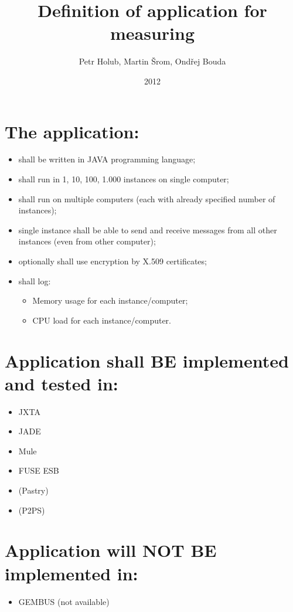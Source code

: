 \documentclass[a4paper]{article}
\title{Definition of application for measuring}
\author{Petr Holub, Martin Šrom, Ondřej Bouda}
\date{2012}
\begin{document}
\maketitle

\section{The application:}
\begin{itemize}
\item shall be written in \textsc{JAVA} programming language;
\item shall run in 1, 10, 100, 1.000 instances on single computer;
\item shall run on multiple computers (each with already specified number of instances);
\item single instance shall be able to send and receive messages from all other instances (even from other computer);
\item optionally shall use encryption by \textsc{X.509} certificates;
\item shall log:
  \begin{itemize}
  \item Memory usage for each instance/computer;
  \item CPU load for each instance/computer.
  \end{itemize}
\end{itemize}

\section{Application shall BE implemented and tested in:}
\begin{itemize}
\item{JXTA}
\item{JADE}
\item{Mule}
\item{FUSE ESB}
\item{(Pastry)}
\item{(P2PS)}
\end{itemize}

\section{Application will NOT BE implemented in:}
\begin{itemize}
\item{GEMBUS} (not available)
\end{itemize}
\end{document}
